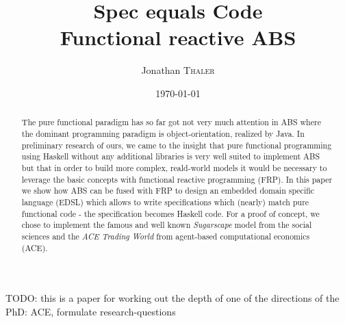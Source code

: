 \documentclass[twocolumn]{article}
\title{Spec equals Code \\ Functional reactive ABS} %
\author{Jonathan \textsc{Thaler}} %
\date{\today} %
\begin{document}
\maketitle %

\begin{abstract}
The pure functional paradigm has so far got not very much attention in ABS where the dominant programming paradigm is object-orientation, realized by Java. In preliminary research of ours, we came to the insight that pure functional programming using Haskell without any additional libraries is very well suited to implement ABS but that in order to build more complex, reald-world models it would be necessary to leverage the basic concepts with functional reactive programming (FRP). In this paper we show how ABS can be fused with FRP to design an embedded domain specific language (EDSL) which allows to write specifications which (nearly) match pure functional code - the specification becomes Haskell code. For a proof of concept, we chose to implement the famous and well known \textit{Sugarscape} model from the social sciences and the \textit{ACE Trading World} from agent-based computational economics (ACE).
\end{abstract}

TODO: this is a paper for working out the depth of one of the directions of the PhD: ACE, formulate research-questions













\end{document}
